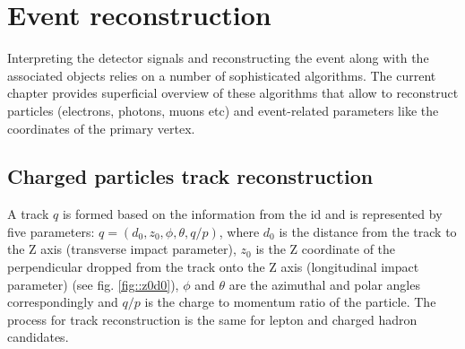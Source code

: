 \chapter{Event reconstruction}
Interpreting the detector signals and reconstructing the event along with the associated objects relies on a number of sophisticated algorithms. The current chapter provides superficial overview of these algorithms that allow to reconstruct particles (electrons, photons, muons etc) and event-related parameters like the coordinates of the primary vertex.
    \section{Charged particles track reconstruction}
    \label{sec::tracking}
    A track $q$ is formed based on the information from the \gls{id} and is represented by five parameters: $q = (d_0,z_0,\phi,\theta,q/p)$, where $d_0$ is the distance from the track to the Z axis (transverse impact parameter), $z_0$ is the Z coordinate of the perpendicular dropped from the track onto the Z axis (longitudinal impact parameter) (see fig. \ref{fig::z0d0}), $\phi$ and $\theta$ are the azimuthal and polar angles correspondingly and $q/p$ is the charge to momentum ratio of the particle. The process for track reconstruction is the same for lepton and charged hadron candidates. 
    
